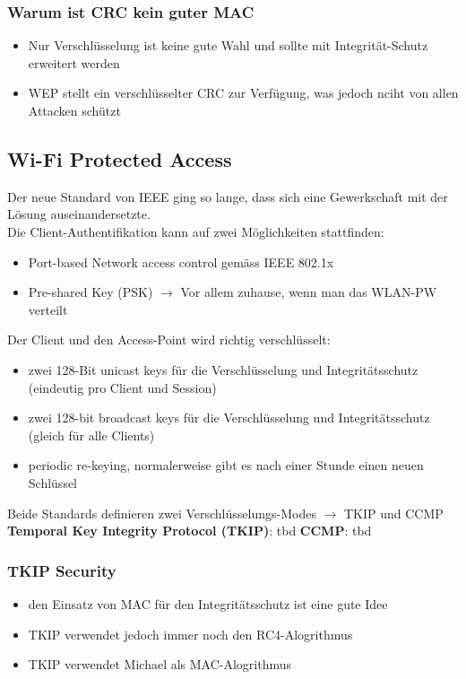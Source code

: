 \documentclass{report}
\theoremstyle{definition}
\theoremstyle{example}
\begin{document}
		\subsubsection{Warum ist CRC kein guter MAC}
\begin{itemize}
	\item Nur Verschlüsselung ist keine gute Wahl und sollte mit Integrität-Schutz erweitert werden
	\item WEP stellt ein verschlüsselter CRC zur Verfügung, was jedoch nciht von allen Attacken schützt
\end{itemize}

	\subsection{Wi-Fi Protected Access}
Der neue Standard von IEEE ging so lange, dass sich eine Gewerkschaft mit der Lösung auseinandersetzte.\\
Die Client-Authentifikation kann auf zwei Möglichkeiten stattfinden:
\begin{itemize}
	\item Port-based Network access control gemäss IEEE 802.1x
	\item Pre-shared Key (PSK) $\rightarrow$ Vor allem zuhause, wenn man das WLAN-PW verteilt
\end{itemize}

Der Client und den Access-Point wird richtig verschlüsselt:
\begin{itemize}
	\item zwei 128-Bit unicast keys für die Verschlüsselung und Integritätsschutz (eindeutig pro Client und Session)
	\item zwei 128-bit broadcast keys für die Verschlüsselung und Integritätsschutz (gleich für alle Clients)
	\item periodic re-keying, normalerweise gibt es nach einer Stunde einen neuen Schlüssel
\end{itemize}

Beide Standards definieren zwei Verschlüsselungs-Modes $\rightarrow$ TKIP und CCMP\\
\textbf{Temporal Key Integrity Protocol (TKIP)}:  tbd
\textbf{CCMP}: tbd

		\subsubsection{TKIP Security}
\begin{itemize}
	\item den Einsatz von MAC für den Integritätsschutz ist eine gute Idee
	\item TKIP verwendet jedoch immer noch den RC4-Alogrithmus
	\item TKIP verwendet Michael als MAC-Alogrithmus
\end{itemize}
\end{document}
